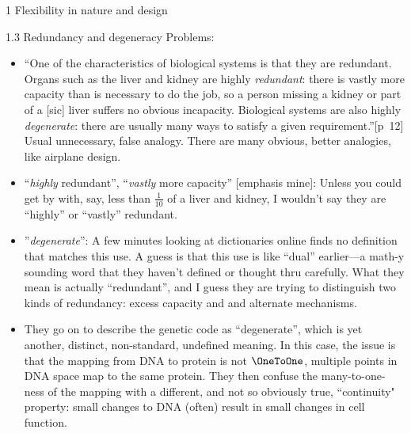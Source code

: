 \documentclass[11pt]{PalisadesLakesBook}
\begin{document}
\begin{plSection}{}
\begin{plSection}{1 Flexibility in nature and design}
\begin{plSection}{1.3 Redundancy and degeneracy}
Problems:
\begin{itemize}
  
  \item ``One of the characteristics of biological systems
is that they are redundant. 
Organs such as the liver and kidney are highly \emph{redundant}:
there is vastly more capacity than is necessary to do the job,
so a person missing a kidney or part of a [sic] liver suffers
no obvious incapacity.
Biological systems are also highly \emph{degenerate}:
there are usually many ways 
to satisfy a given requirement.''[p~12]
Usual unnecessary, false analogy.
  There are many obvious, better analogies, like airplane design.
  
  \item ``\emph{highly} redundant'',
  ``\emph{vastly} more capacity'' [emphasis mine]:
  Unless you could get by with, say,  less than $\frac{1}{10}$ 
  of a liver and kidney, I wouldn't say they are ``highly'' or
  ``vastly'' redundant.
  
  \item''\emph{degenerate}'': A few minutes looking at 
  dictionaries online finds no definition that matches this use.
  A guess is that this use is like ``dual'' earlier---a math-y
  sounding word that they haven't defined or thought thru
  carefully. What they mean is actually ``redundant'',
  and I guess they are trying to distinguish two kinds 
  of redundancy: excess capacity and and alternate mechanisms.
  
  \item They go on to describe the genetic code as ``degenerate'',
  which is yet another, distinct, non-standard, undefined meaning. 
  In this case, the issue is that
  the mapping from DNA to protein is not $\OneToOne$,
  multiple points in DNA space map to the same protein.
  They then confuse the many-to-one-ness of the mapping
  with a different, and not so obviously true, ``continuity" 
  property:
  small changes to DNA (often) result 
  in small changes in cell function.
  

\end{itemize}
\end{plSection}
\end{plSection}
\end{plSection}
\end{document}
